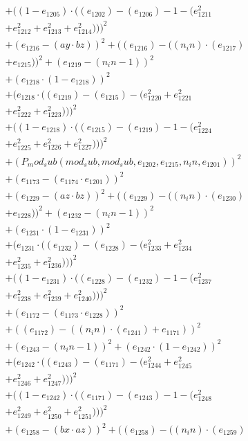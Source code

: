 \documentclass[10pt, a4paper]{article}
\begin{document}
\begin{align*}
& + ((1 - e_{1205})  \cdot  ((e_{1202}) - (e_{1206}) - 1 - (e_{1211}^{2} \\
& + e_{1212}^{2} + e_{1213}^{2} + e_{1214}^{2})))^{2} \\
& + (e_{1216} - (ay  \cdot  bz))^{2} + ((e_{1216}) - ((n_in)  \cdot  (e_{1217}) \\
& + e_{1215}))^{2} + (e_{1219} - (n_in - 1))^{2} \\
& + (e_{1218}  \cdot  (1 - e_{1218}))^{2} \\
& + (e_{1218}  \cdot  ((e_{1219}) - (e_{1215}) - (e_{1220}^{2} + e_{1221}^{2} \\
& + e_{1222}^{2} + e_{1223}^{2})))^{2} \\
& + ((1 - e_{1218})  \cdot  ((e_{1215}) - (e_{1219}) - 1 - (e_{1224}^{2} \\
& + e_{1225}^{2} + e_{1226}^{2} + e_{1227}^{2})))^{2} \\
& + (P_mod_sub(mod_sub, mod_sub, e_{1202}, e_{1215}, n_in, e_{1201}))^{2} \\
& + (e_{1173} - (e_{1174}  \cdot  e_{1201}))^{2} \\
& + (e_{1229} - (az  \cdot  bz))^{2} + ((e_{1229}) - ((n_in)  \cdot  (e_{1230}) \\
& + e_{1228}))^{2} + (e_{1232} - (n_in - 1))^{2} \\
& + (e_{1231}  \cdot  (1 - e_{1231}))^{2} \\
& + (e_{1231}  \cdot  ((e_{1232}) - (e_{1228}) - (e_{1233}^{2} + e_{1234}^{2} \\
& + e_{1235}^{2} + e_{1236}^{2})))^{2} \\
& + ((1 - e_{1231})  \cdot  ((e_{1228}) - (e_{1232}) - 1 - (e_{1237}^{2} \\
& + e_{1238}^{2} + e_{1239}^{2} + e_{1240}^{2})))^{2} \\
& + (e_{1172} - (e_{1173}  \cdot  e_{1228}))^{2} \\
& + ((e_{1172}) - ((n_in)  \cdot  (e_{1241}) + e_{1171}))^{2} \\
& + (e_{1243} - (n_in - 1))^{2} + (e_{1242}  \cdot  (1 - e_{1242}))^{2} \\
& + (e_{1242}  \cdot  ((e_{1243}) - (e_{1171}) - (e_{1244}^{2} + e_{1245}^{2} \\
& + e_{1246}^{2} + e_{1247}^{2})))^{2} \\
& + ((1 - e_{1242})  \cdot  ((e_{1171}) - (e_{1243}) - 1 - (e_{1248}^{2} \\
& + e_{1249}^{2} + e_{1250}^{2} + e_{1251}^{2})))^{2} \\
& + (e_{1258} - (bx  \cdot  az))^{2} + ((e_{1258}) - ((n_in)  \cdot  (e_{1259}) \\

\end{align*}
\end{document}
